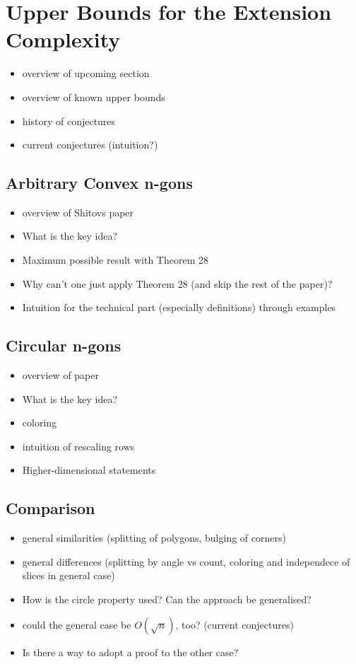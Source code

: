 
\section{Upper Bounds for the Extension Complexity}

\begin{itemize}
  \item overview of upcoming section
  \item overview of known upper bounds
  \item history of conjectures
  \item current conjectures (intuition?)
\end{itemize}

\subsection{Arbitrary Convex n-gons}

\begin{itemize}
  \item overview of Shitovs paper
  \item What is the key idea?
  \item Maximum possible result with Theorem 28
  \item Why can't one just apply Theorem 28 (and skip the rest of the paper)?
  \item Intuition for the technical part (especially definitions) through examples
\end{itemize}

\subsection{Circular n-gons}

\begin{itemize}
  \item overview of paper
  \item What is the key idea?
  \item coloring
  \item intuition of rescaling rows
  \item Higher-dimensional statements
\end{itemize}

\subsection{Comparison}

\begin{itemize}
  \item general similarities (splitting of polygons, bulging of corners)
  \item general differences (splitting by angle vs count, coloring and independece of slices in general case)
  \item How is the circle property used? Can the approach be generalised?
  \item could the general case be $O(\sqrt{n})$, too? (current conjectures)
  \item Is there a way to adopt a proof to the other case?
\end{itemize}
